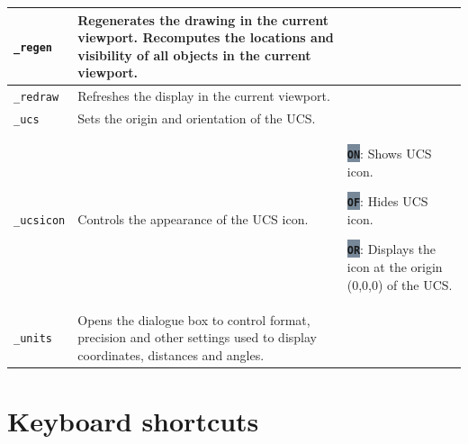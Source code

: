 \documentclass[..]{../IEEEphot}
\newcommand{\param}[1]{\colorbox{LightSlateGray}{\color{Navy}\texttt{\textbf{#1}}}}
\begin{document}
\begin{center}
\begin{longtable}{m{.2\linewidth}m{.33\linewidth}m{.33\linewidth}}
\\
\midrule
\texttt{\_regen} & Regenerates the drawing in the current viewport. Recomputes the locations and visibility of all objects in the current viewport. & 
\\
\midrule
\texttt{\_redraw} & Refreshes the display in the current viewport. & 
\\
\midrule
\texttt{\_ucs} & Sets the origin and orientation of the UCS. & 
\\
\midrule
\texttt{\_ucsicon} & Controls the appearance of the UCS icon. & 
\param{ON}: Shows UCS icon.

\param{OF}: Hides UCS icon.

\param{OR}: Displays the icon at the origin (0,0,0) of the UCS.
\\
\midrule
\texttt{\_units} & Opens the dialogue box to control format, precision and other settings used to display coordinates, distances and angles.
\\
\bottomrule
\end{longtable}
\end{center}

\clearpage

\section{Keyboard shortcuts}
\end{document}
